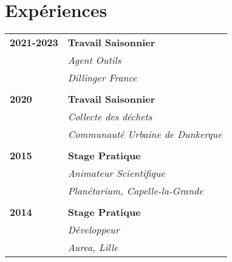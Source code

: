 \documentclass[a4paper, 12pt]{article}
\begin{document}
\begin{minipage}[t]{0.65\textwidth}
    \section*{\textcolor{sectioncolor}{Expériences}}
    \begin{tabular}{ m{} m{} }
        \textbf{2021-2023} & \textbf{Travail Saisonnier} \\
        & \textit{Agent Outils} \\
        & \textit{Dillinger France} \\
        & \\
        \textbf{2020} & \textbf{Travail Saisonnier} \\
        & \textit{Collecte des déchets} \\
        & \textit{Communauté Urbaine de Dunkerque} \\
        & \\
        \textbf{2015} & \textbf{Stage Pratique} \\
        & \textit{Animateur Scientifique} \\
        & \textit{Planétarium, Capelle-la-Grande} \\
        & \\
        \textbf{2014} & \textbf{Stage Pratique} \\
        & \textit{Développeur} \\
        & \textit{Aurea, Lille} \\
    \end{tabular}

\end{minipage}
\end{document}

